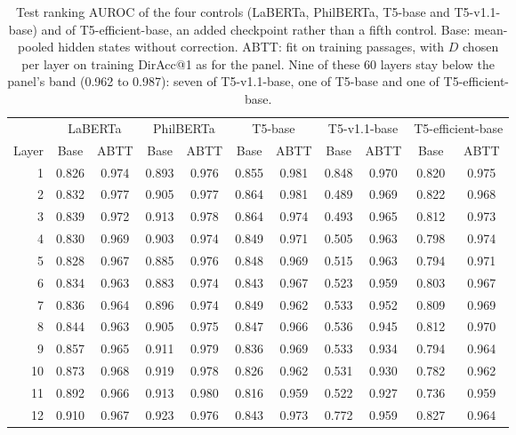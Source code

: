 \begin{table}[t]
\centering
\footnotesize
\setlength{\tabcolsep}{4pt}
\begin{tabular}{@{}rcccccccccc@{}}
\toprule
& \multicolumn{2}{c}{LaBERTa} & \multicolumn{2}{c}{PhilBERTa} & \multicolumn{2}{c}{T5-base} & \multicolumn{2}{c}{T5-v1.1-base} & \multicolumn{2}{c}{T5-efficient-base} \\
\cmidrule(lr){2-3}\cmidrule(lr){4-5}\cmidrule(lr){6-7}\cmidrule(lr){8-9}\cmidrule(lr){10-11}
Layer & Base & ABTT & Base & ABTT & Base & ABTT & Base & ABTT & Base & ABTT \\
\midrule
1 & 0.826 & 0.974 & 0.893 & 0.976 & 0.855 & 0.981 & 0.848 & 0.970 & 0.820 & 0.975 \\
2 & 0.832 & 0.977 & 0.905 & 0.977 & 0.864 & 0.981 & 0.489 & 0.969 & 0.822 & 0.968 \\
3 & 0.839 & 0.972 & 0.913 & 0.978 & 0.864 & 0.974 & 0.493 & 0.965 & 0.812 & 0.973 \\
4 & 0.830 & 0.969 & 0.903 & 0.974 & 0.849 & 0.971 & 0.505 & 0.963 & 0.798 & 0.974 \\
5 & 0.828 & 0.967 & 0.885 & 0.976 & 0.848 & 0.969 & 0.515 & 0.963 & 0.794 & 0.971 \\
6 & 0.834 & 0.963 & 0.883 & 0.974 & 0.843 & 0.967 & 0.523 & 0.959 & 0.803 & 0.967 \\
7 & 0.836 & 0.964 & 0.896 & 0.974 & 0.849 & 0.962 & 0.533 & 0.952 & 0.809 & 0.969 \\
8 & 0.844 & 0.963 & 0.905 & 0.975 & 0.847 & 0.966 & 0.536 & 0.945 & 0.812 & 0.970 \\
9 & 0.857 & 0.965 & 0.911 & 0.979 & 0.836 & 0.969 & 0.533 & 0.934 & 0.794 & 0.964 \\
10 & 0.873 & 0.968 & 0.919 & 0.978 & 0.826 & 0.962 & 0.531 & 0.930 & 0.782 & 0.962 \\
11 & 0.892 & 0.966 & 0.913 & 0.980 & 0.816 & 0.959 & 0.522 & 0.927 & 0.736 & 0.959 \\
12 & 0.910 & 0.967 & 0.923 & 0.976 & 0.843 & 0.973 & 0.772 & 0.959 & 0.827 & 0.964 \\
\bottomrule
\end{tabular}
\caption{Test ranking AUROC of the four controls (LaBERTa, PhilBERTa, T5-base and T5-v1.1-base) and of T5-efficient-base, an added checkpoint rather than a fifth control. Base: mean-pooled hidden states without correction. ABTT: fit on training passages, with $D$ chosen per layer on training DirAcc@1 as for the panel. Nine of these 60 layers stay below the panel's band (0.962 to 0.987): seven of T5-v1.1-base, one of T5-base and one of T5-efficient-base.}
\label{tab:d2_controls_abtt}
\end{table}
